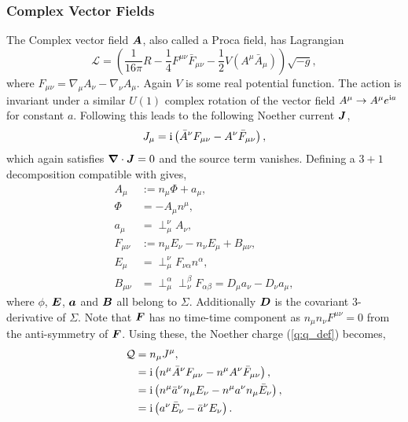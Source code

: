 \subsubsection{Complex Vector Fields} \label{q:sect:noether2}
The Complex vector field $\boldsymbol{A}$, also called a Proca field, has Lagrangian
\begin{equation}
\mathcal{L} = \left(\frac{1}{16 \pi }R -\frac{1}{4}F^{\mu\nu}\bar{F}_{\mu\nu} - \frac{1}{2}V(A^\mu \bar{A}_\mu) \right)\sqrt{-g},
\end{equation}
where $F_{\mu\nu} = \nabla_\mu A_\nu - \nabla_\nu A_\mu$. Again $V$ is some real potential function. The action is invariant under a similar $U(1)$ complex rotation of the vector field $A^\mu \rightarrow A^\mu e^{{\rm i} a}$ for constant $a$. Following \cite{Minamitsuji_2018} this leads to the following Noether current $\boldsymbol{J}$,
\begin{align}
J_\mu = {\rm i}\left(\bar{A}^\nu F_{\mu\nu} - A^\nu \bar{F}_{\mu\nu} \right),
\end{align} 
which again satisfies $\boldsymbol{\nabla}\cdot \boldsymbol{J} =0$ and the source term vanishes. Defining a $3+1$ decomposition compatible with \cite{Zilh_o_2015} gives,
\begin{align}
A_\mu &:= n_\mu \Phi + a_\mu, \\
\Phi &= -A_\mu n^\mu, \\
a_\mu &= \perp^\nu_\mu A_\nu, \\
F_{\mu\nu} &:= n_\mu E_\nu - n_\nu E_\mu + B_{\mu\nu}, \\
E_\mu &= \perp^\nu_\mu F_{\nu\alpha}n^\alpha, \\
B_{\mu\nu} &= \perp^\alpha_\mu \perp^\beta_\nu F_{\alpha\beta} = D_\mu a_\nu - D_\nu a_\mu,
\end{align}
where $\phi$, $\boldsymbol{E}$, $\boldsymbol{a}$ and $\boldsymbol{B}$ all belong to $\Sigma$. Additionally $\boldsymbol{D}$ is the covariant 3-derivative of $\Sigma$. Note that $\boldsymbol{F}$ has no time-time component as $n_\mu n_\nu F^{\mu\nu} =0$ from the anti-symmetry of $\boldsymbol{F}$. Using these, the Noether charge (\ref{q:q_def}) becomes,
\begin{align}
\mathcal{Q}&= n_\mu J^\mu, \\
           &={\rm i}\left( n^\mu \bar{A}^\nu F_{\mu\nu} - n^\mu A^\nu \bar{F}_{\mu\nu}  \right), \\
           &={\rm i}\left( n^\mu \bar{a}^\nu n_\mu E_\nu - n^\mu a^\nu n_\mu \bar{E}_{\nu}  \right), \\
           &={\rm i}\left( a^\nu \bar{E}_{\nu}  - \bar{a}^\nu E_\nu  \right).
\end{align}
